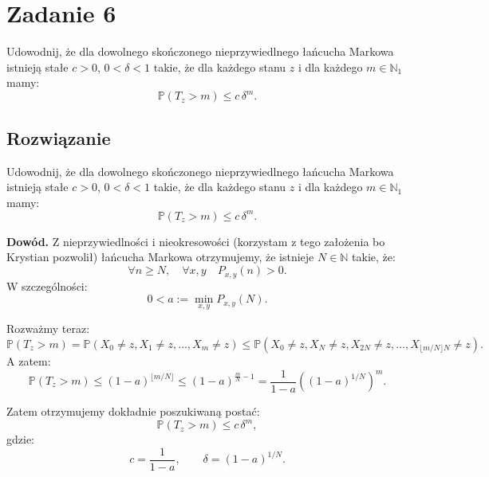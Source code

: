 \section{Zadanie 6}
Udowodnij, że dla dowolnego skończonego nieprzywiedlnego łańcucha Markowa
istnieją stałe \(c > 0\), \(0 < \delta < 1\) takie, że dla każdego stanu \(z\) i dla każdego \(m \in \mathbb{N}_1\) mamy:
\[
	\mathbb{P}(T_z > m) \leq c \, \delta^m.
\]

\subsection*{Rozwiązanie}
Udowodnij, że dla dowolnego skończonego nieprzywiedlnego łańcucha Markowa
istnieją stałe \(c > 0\), \(0 < \delta < 1\) takie, że dla każdego stanu \(z\) i dla każdego \(m \in \mathbb{N}_1\) mamy:
\[
	\mathbb{P}(T_z > m) \leq c \, \delta^m.
\]

\textbf{Dowód.}
Z nieprzywiedlności i nieokresowości (korzystam z tego założenia bo Krystian pozwolił) łańcucha Markowa otrzymujemy, że istnieje \(N \in \mathbb{N}\) takie, że:
\[
	\forall n \geq N, \quad \forall x, y \quad P_{x,y}(n) > 0.
\]
W szczególności:
\[
	0 < a := \min_{x,y} P_{x,y}(N).
\]

Rozważmy teraz:
\[
	\mathbb{P}(T_z > m)
	= \mathbb{P}(X_0 \neq z, X_1 \neq z, \dots, X_m \neq z)
	\leq \mathbb{P}(X_0 \neq z, X_N \neq z, X_{2N} \neq z, \dots, X_{\lfloor m/N \rfloor N} \neq z).
\]
A zatem:
\[
	\mathbb{P}(T_z > m) \leq (1 - a)^{\lfloor m/N \rfloor}
	\leq (1 - a)^{\frac{m}{N} - 1}
	= \frac{1}{1-a} \left( (1 - a)^{1/N} \right)^m.
\]

Zatem otrzymujemy dokładnie poszukiwaną postać:
\[
	\mathbb{P}(T_z > m) \leq c \, \delta^m,
\]
gdzie:
\[
	c = \frac{1}{1-a}, \qquad \delta = (1-a)^{1/N}.
\]
